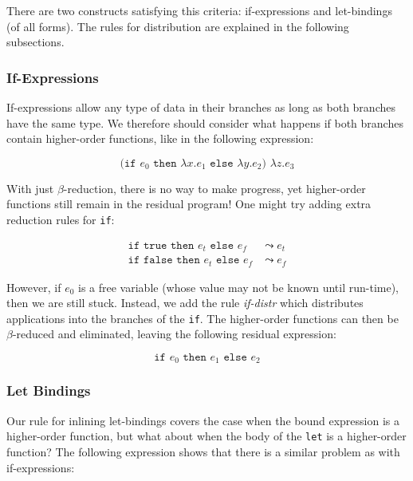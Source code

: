 \documentclass[runningheads]{llncs}
\begin{document}
There are two constructs satisfying this criteria: if-expressions and let-bindings (of all forms). The rules for distribution are explained in the following subsections.

\subsubsection{If-Expressions}

If-expressions allow any type of data in their branches as long as both branches have the same type. We therefore should consider what happens if both branches contain higher-order functions, like in the following expression:

\begin{equation*}
  \texttt{(if $e_0$ then $\lambda x. e_1$ else $\lambda y. e_2$) $\lambda z. e_3$}
\end{equation*}

With just $\beta$-reduction, there is no way to make progress, yet higher-order functions still remain in the residual program! One might try adding extra reduction rules for \texttt{if}:

\begin{equation*}
  \begin{split}
    \texttt{if true then $e_t$ else $e_f$} &\leadsto e_t \\
    \texttt{if false then $e_t$ else $e_f$} &\leadsto e_f
  \end{split}
\end{equation*}

However, if $e_0$ is a free variable (whose value may not be known until run-time), then we are still stuck. Instead, we add the rule \textit{if-distr} which distributes applications into the branches of the \texttt{if}. The higher-order functions can then be $\beta$-reduced and eliminated, leaving the following residual expression:

\begin{equation*}
  \texttt{if $e_0$ then $e_1$ else $e_2$}
\end{equation*}

\subsubsection{Let Bindings}

Our rule for inlining let-bindings covers the case when the bound expression is a higher-order function, but what about when the body of the \texttt{let} is a higher-order function? The following expression shows that there is a similar problem as with if-expressions:
\end{document}
